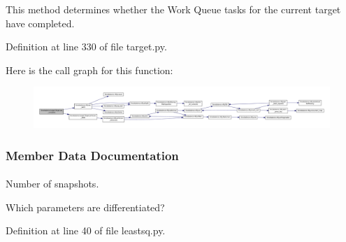 \-This method determines whether the \-Work \-Queue tasks for the current target have completed. 



\-Definition at line 330 of file target.\-py.



\-Here is the call graph for this function\-:\nopagebreak
\begin{figure}[H]
\begin{center}
\leavevmode
\includegraphics[width=350pt]{classforcebalance_1_1target_1_1Target_af6099ec09486213869dba2491bd8ea04_cgraph}
\end{center}
\end{figure}




\subsubsection{\-Member \-Data \-Documentation}
\hypertarget{classforcebalance_1_1leastsq_1_1LeastSquares_a667caf3a5471d9063ab400dcbb40a003}{
\paragraph[{call\-\_\-derivatives}]{}}\label{classforcebalance_1_1leastsq_1_1LeastSquares_a667caf3a5471d9063ab400dcbb40a003}


\-Number of snapshots. 

\-Which parameters are differentiated? 

\-Definition at line 40 of file leastsq.\-py.

\hypertarget{classforcebalance_1_1leastsq_1_1LeastSquares_a1691b076e288ed6a3685c38f56653767}{
\paragraph[{\-D}]{}}\label{classforcebalance_1_1leastsq_1_1LeastSquares_a1691b076e288ed6a3685c38f56653767}


